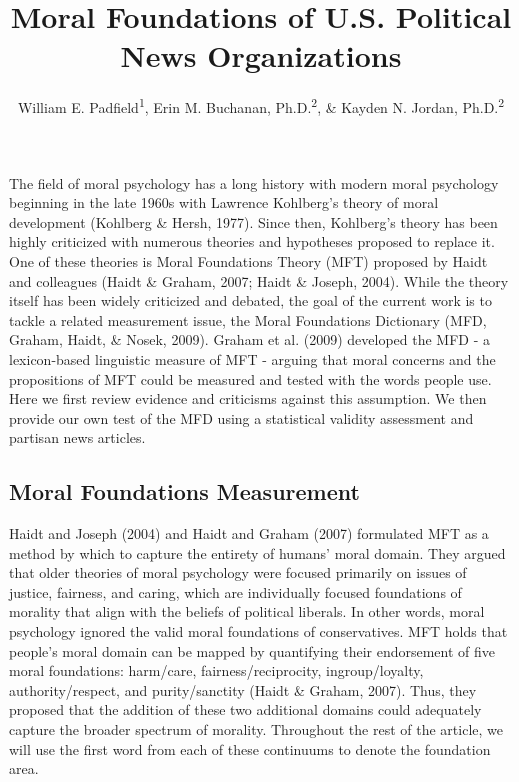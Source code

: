 \documentclass[
  man,floatsintext]{apa6}
\title{Moral Foundations of U.S. Political News Organizations}
\author{William E. Padfield\textsuperscript{1}, Erin M. Buchanan, Ph.D.\textsuperscript{2}, \& Kayden N. Jordan, Ph.D.\textsuperscript{2}}
\date{}
\affiliation{\vspace{0.5cm}\textsuperscript{1} Missouri State University\\\textsuperscript{2} Harrisburg University of Science and Technology}
\begin{document}
\maketitle

The field of moral psychology has a long history with modern moral
psychology beginning in the late 1960s with Lawrence Kohlberg's theory
of moral development (Kohlberg \& Hersh, 1977). Since then, Kohlberg's theory has
been highly criticized with numerous theories and hypotheses proposed to
replace it. One of these theories is Moral Foundations Theory (MFT)
proposed by Haidt and colleagues (Haidt \& Graham, 2007; Haidt \& Joseph, 2004). While the
theory itself has been widely criticized and debated, the goal of the
current work is to tackle a related measurement issue, the Moral
Foundations Dictionary (MFD, Graham, Haidt, \& Nosek, 2009). Graham et al. (2009) developed the
MFD - a lexicon-based linguistic measure of MFT - arguing that moral
concerns and the propositions of MFT could be measured and tested with
the words people use. Here we first review evidence and criticisms
against this assumption. We then provide our own test of the MFD using a statistical validity assessment and partisan news articles.

\subsection{Moral Foundations Measurement}\label{moral-foundations-measurement}

Haidt and Joseph (2004) and Haidt and Graham (2007)
formulated MFT as a method by which to capture the entirety of humans'
moral domain. They argued that older theories of moral psychology were
focused primarily on issues of justice, fairness, and caring, which are
individually focused foundations of morality that align with the beliefs
of political liberals. In other words, moral psychology ignored the
valid moral foundations of conservatives. MFT holds that people's moral
domain can be mapped by quantifying their endorsement of five moral
foundations: harm/care, fairness/reciprocity, ingroup/loyalty,
authority/respect, and purity/sanctity (Haidt \& Graham, 2007). Thus, they
proposed that the addition of these two additional domains could
adequately capture the broader spectrum of morality. Throughout the rest of the article, we will use the first word from each of these continuums to denote the foundation area.
\end{document}

